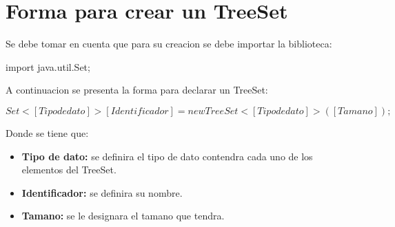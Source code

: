 \documentclass[12pt, letterpaper]{article} %
\begin{document}
\section*{Forma para crear un TreeSet}
Se debe tomar en cuenta que para su creacion se debe importar la biblioteca:
\begin{center}
    import java.util.Set;
\end{center}
A continuacion se presenta la forma para declarar un TreeSet:
\begin{center}
    $Set<[Tipo de dato]> [Identificador] = new TreeSet<[Tipo de dato]>([Tamano]);$
\end{center}
Donde se tiene que:
\begin{itemize}
    \item \textbf{Tipo de dato:} se definira el tipo de dato contendra cada uno de los elementos del TreeSet.
    \item \textbf{Identificador:} se definira su nombre.
    \item \textbf{Tamano:} se le designara el tamano que tendra.
\end{itemize}
\end{document}
